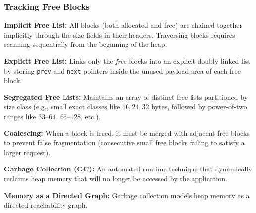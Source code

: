 \subsubsection{Tracking Free Blocks}

\begin{definition}
    \textbf{Implicit Free List:} All blocks (both allocated and free) are chained together implicitly through the size fields in their headers. Traversing blocks requires scanning sequentially from the beginning of the heap.
\end{definition}

\begin{definition}
    \textbf{Explicit Free List:} Links only the \emph{free} blocks into an explicit doubly linked list by storing \texttt{prev} and \texttt{next} pointers inside the unused payload area of each free block.
\end{definition}

\begin{definition}
    \textbf{Segregated Free Lists:} Maintains an array of distinct free lists partitioned by size class (e.g., small exact classes like $16, 24, 32$ bytes, followed by power-of-two ranges like $33\text{--}64$, $65\text{--}128$, etc.).
\end{definition}

\begin{definition}
        \textbf{Coalescing:} When a block is freed, it must be merged with adjacent free blocks to prevent false fragmentation (consecutive small free blocks failing to satisfy a larger request).
\end{definition}

\begin{definition}
    \textbf{Garbage Collection (GC):} An automated runtime technique that dynamically reclaims heap memory that will no longer be accessed by the application.
\end{definition}

\begin{remark}
    \textbf{Memory as a Directed Graph:} Garbage collection models heap memory as a directed reachability graph.
\end{remark}

